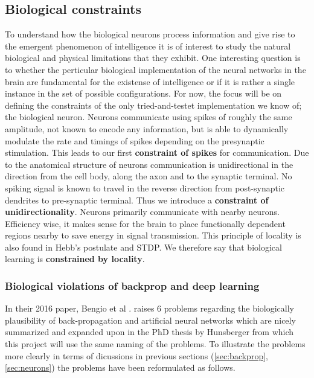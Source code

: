 \documentclass[a4paper,11pt]{article} %
\begin{document}
\subsection{Biological constraints} \label{sec:biological-constraints}
To understand how the biological neurons process information and give rise to the emergent phenomenon of intelligence it is of interest to study the natural biological and physical limitations that they exhibit. One interesting question is to whether the perticular biological implementation of the neural networks in the brain are fundamental for the existense of intelligence or if it is rather a single instance in the set of possible configurations. For now, the focus will be on defining the constraints of the only tried-and-testet implementation we know of; the biological neuron. Neurons communicate using spikes of roughly the same amplitude, not known to encode any information, but is able to dynamically modulate the rate and timings of spikes depending on the presynaptic stimulation. This leads to our first \textbf{constraint of spikes} for communication. Due to the anatomical structure of neurons communication is unidirectional in the direction from the cell body, along the axon and to the synaptic terminal. No spiking signal is known to travel in the reverse direction from post-synaptic dendrites to pre-synaptic terminal. Thus we introduce a \textbf{constraint of unidirectionality}. Neurons primarily communicate with nearby neurons. Efficiency wise, it makes sense for the brain to place functionally dependent regions nearby to save energy in signal transmission. This principle of locality is also found in Hebb's postulate and STDP. We therefore say that biological learning is \textbf{constrained by locality}.

\subsubsection{Biological violations of backprop and deep learning}
In their 2016 paper, Bengio et al \cite{BengioLBL15}. raises 6 problems regarding the biologically plausibility of back-propagation and artificial neural networks which are nicely summarized and expanded upon in the PhD thesis by Hunsberger \cite{Eric2018} from which this project will use the same naming of the problems. To illustrate the problems more clearly in terms of dicussions in previous sections (\ref{sec:backprop}, \ref{sec:neurons}) the problems have been reformulated as follows.
\end{document}
